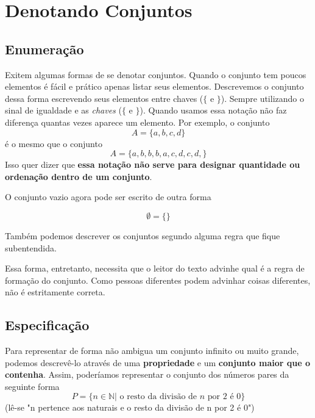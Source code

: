 \section{Denotando Conjuntos}
\subsection{Enumeração}


Exitem algumas formas de se denotar conjuntos. Quando o conjunto tem poucos elementos é fácil e prático apenas listar seus elementos. Descrevemos o conjunto dessa forma escrevendo seus elementos entre chaves ($\{$ e $\}$).
Sempre utilizando o sinal de igualdade e as \emph{chaves} ($\{$ e $\}$). Quando usamos essa notação não faz diferença quantas vezes aparece um elemento. Por exemplo, o conjunto $$A = \{a,b,c,d\}$$é o mesmo que o conjunto$$A =\{a,b,b,b,a,c,d,c,d,\}$$Isso quer dizer que \textbf{essa notação não serve para designar quantidade ou ordenação dentro de um conjunto}.

O conjunto vazio agora pode ser escrito de outra forma

$$\emptyset = \{\}$$


Também podemos descrever os conjuntos segundo alguma regra que fique subentendida.


Essa forma, entretanto, necessita que o leitor do texto advinhe qual é a regra de formação do conjunto. Como pessoas diferentes podem advinhar coisas diferentes, não é estritamente correta.
\subsection{Especificação}
Para representar de forma não ambigua um conjunto infinito ou muito grande, podemos descrevê-lo através de uma \textbf{propriedade} e um \textbf{conjunto maior que o contenha}. Assim, poderíamos representar o conjunto dos números pares da seguinte forma$$P = \{ n \in \mathbb{N} | \text{ o resto da divisão de } n \text{ por } 2 \text{ é } 0\}$$ (lê-se "n pertence aos naturais e o resto da divisão de n por 2 é 0")

